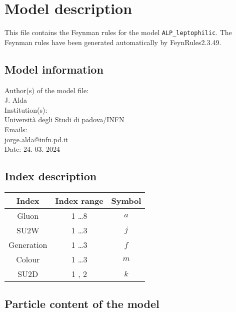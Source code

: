 \documentclass[11pt]{article}
\begin{document}
\section{Model description}
This file contains the Feynman rules for the model \verb+ALP_leptophilic+.
The Feynman rules have been generated automatically by FeynRules2.3.49.

\subsection{Model information}

Author(s) of the model file: \\
\indent J. Alda\\
Institution(s):\\
\indent Università degli Studi di padova/INFN\\
Emails:\\
\indent jorge.alda@infn.pd.it\\
Date: {24. 03. 2024}\\

\subsection{Index description}

\begin{center}\begin{tabular}{|c|c|c|}
\hline
Index & Index range & Symbol\\ 
\hline
Gluon & 1 \ldots 8 & $ a $\\ 
\hline
SU2W & 1 \ldots 3 & $ j $\\ 
\hline
Generation & 1 \ldots 3 & $ f $\\ 
\hline
Colour & 1 \ldots 3 & $ m $\\ 
\hline
SU2D & 1 , 2 & $ k $
\\ \hline
\end{tabular}\end{center}
\subsection{Particle content of the model}
\end{document}
